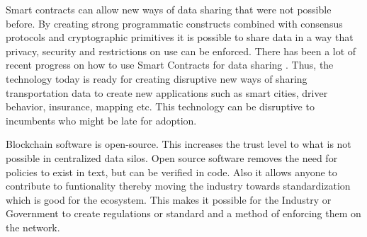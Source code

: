 Smart contracts can allow new ways of data sharing that were not possible before. By creating strong programmatic
constructs combined with consensus protocols and cryptographic primitives it is possible to share data in a way that
privacy, security and restrictions on use can be enforced. There has been a lot of recent progress on how to use Smart
Contracts for data sharing \cite{liu_2018}. Thus, the technology today is ready for creating disruptive new ways of
sharing transportation data to create new applications such as smart cities, driver behavior, insurance, mapping etc.
This technology can be disruptive to incumbents who might be late for adoption.

Blockchain software is open-source. This increases the trust level to what is not possible in centralized data silos.
Open source software removes the need for policies to exist in text, but can be verified in code. Also it allows anyone
to contribute to funtionality thereby moving the industry towards standardization which is good for the ecosystem. This
makes it possible for the Industry or Government to create regulations or standard and a method of enforcing them on the
network.

%
%
%
%
%
%
%
%
